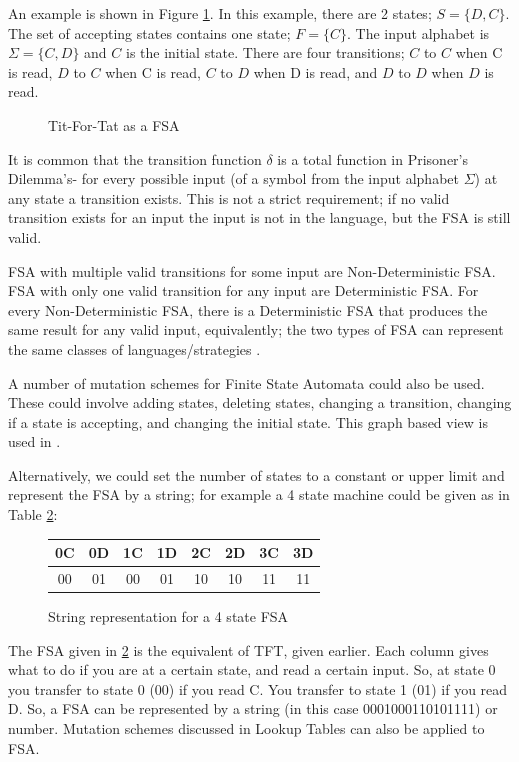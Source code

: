 \documentclass[a4paper,11pt,bcshonoursthesis,singlespace,twoside,thesisdraft,pdflatex]{cssethesis}
\renewcommand{\cite}{\citep} %
\begin{document}
An example is shown in Figure \ref{fig:fsa.tft.lang2}. 
In this example, there are 2 states; $S=\{D,C\}$. 
The set of accepting states contains one state; $F=\{C\}$. 
The input alphabet is $\Sigma=\{C,D\}$ and $C$ is the initial state. 
There are four transitions; $C$ to $C$ when C is read, $D$ to $C$ when C is read, $C$ to $D$ when D is read, and $D$ to $D$ when $D$ is read.

\begin{figure}[h]
\centering
\label{fig:fsa.tft.lang2}
\caption{Tit-For-Tat as a FSA}
\end{figure}

It is common that the transition function $\delta$ is a total function in Prisoner's Dilemma's- for every possible input (of a symbol from the input alphabet $\Sigma$) at any state a transition exists. 
This is not a strict requirement; if no valid transition exists for an input the input is not in the language, but the FSA is still valid. 

FSA with multiple valid transitions for some input are Non-Deterministic FSA. 
FSA with only one valid transition for any input are Deterministic FSA. 
For every Non-Deterministic FSA, there is a Deterministic FSA that produces the same result for any valid input, equivalently; the two types of FSA can represent the same classes of languages/strategies \cite{Sipser2006chap1}. 

A number of mutation schemes for Finite State Automata could also be used. 
These could involve adding states, deleting states, changing a transition, changing if a state is accepting, and changing the initial state. 
This graph based view is used in \cite{van-veelen:PNAS:2012}. 

Alternatively, we could set the number of states to a constant or upper limit and represent the FSA by a string; for example a 4 state machine could be given as in Table \ref{table:fsa4state}:
\begin{figure}[h]
\centering
\label{table:fsa4state}
\begin{tabular}{|c|c|c|c|c|c|c|c|}
\hline
0C & 0D & 1C&1D&2C&2D&3C&3D\\
\hline
00 & 01 & 00&01&10&10&11&11\\
\hline
\end{tabular}\hfill
\caption{String representation for a 4 state FSA}
\end{figure}
The FSA given in \ref{table:fsa4state} is the equivalent of TFT, given earlier. 
Each column gives what to do if you are at a certain state, and read a certain input. 
So, at state 0 you transfer to state 0 (00) if you read C. 
You transfer to state 1 (01) if you read D. 
So, a FSA can be represented by a string (in this case 0001000110101111) or number. 
Mutation schemes discussed in Lookup Tables can also be applied to FSA. 
\end{document}
